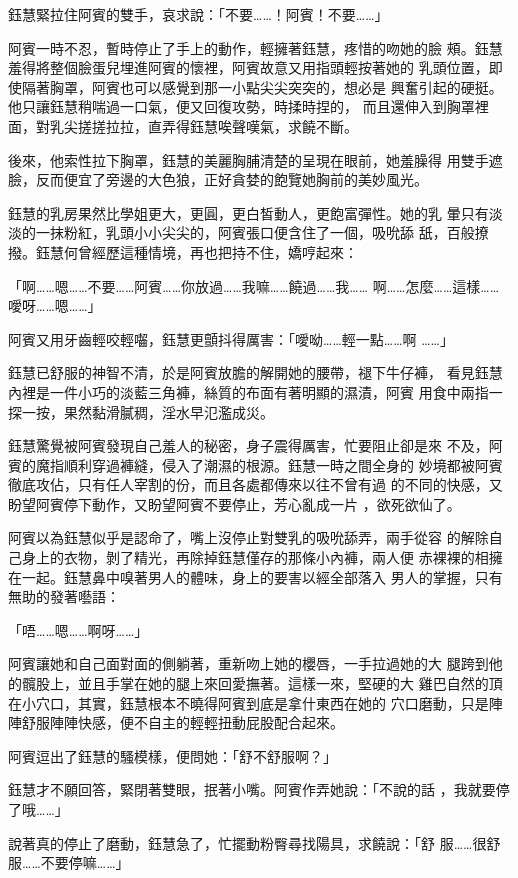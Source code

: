 鈺慧緊拉住阿賓的雙手，哀求說：「不要……！阿賓！不要……」

阿賓一時不忍，暫時停止了手上的動作，輕擁著鈺慧，疼惜的吻她的臉
頰。鈺慧羞得將整個臉蛋兒埋進阿賓的懷裡，阿賓故意又用指頭輕按著她的
乳頭位置，即使隔著胸罩，阿賓也可以感覺到那一小點尖尖突突的，想必是
興奮引起的硬挺。他只讓鈺慧稍喘過一口氣，便又回復攻勢，時揉時捏的，
而且還伸入到胸罩裡面，對乳尖搓搓拉拉，直弄得鈺慧唉聲嘆氣，求饒不斷。

後來，他索性拉下胸罩，鈺慧的美麗胸脯清楚的呈現在眼前，她羞臊得
用雙手遮臉，反而便宜了旁邊的大色狼，正好貪婪的飽覽她胸前的美妙風光。

鈺慧的乳房果然比學姐更大，更圓，更白皙動人，更飽富彈性。她的乳
暈只有淡淡的一抹粉紅，乳頭小小尖尖的，阿賓張口便含住了一個，吸吮舔
舐，百般撩撥。鈺慧何曾經歷這種情境，再也把持不住，嬌哼起來：

「啊……嗯……不要……阿賓……你放過……我嘛……饒過……我……
啊……怎麼……這樣……噯呀……嗯……」

阿賓又用牙齒輕咬輕囓，鈺慧更顫抖得厲害：「噯呦……輕一點……啊
……」

鈺慧已舒服的神智不清，於是阿賓放膽的解開她的腰帶，褪下牛仔褲，
看見鈺慧內裡是一件小巧的淡藍三角褲，絲質的布面有著明顯的濕漬，阿賓
用食中兩指一探一按，果然黏滑膩稠，淫水早氾濫成災。

鈺慧驚覺被阿賓發現自己羞人的秘密，身子震得厲害，忙要阻止卻是來
不及，阿賓的魔指順利穿過褲縫，侵入了潮濕的根源。鈺慧一時之間全身的
妙境都被阿賓徹底攻佔，只有任人宰割的份，而且各處都傳來以往不曾有過
的不同的快感，又盼望阿賓停下動作，又盼望阿賓不要停止，芳心亂成一片
，欲死欲仙了。

阿賓以為鈺慧似乎是認命了，嘴上沒停止對雙乳的吸吮舔弄，兩手從容
的解除自己身上的衣物，剝了精光，再除掉鈺慧僅存的那條小內褲，兩人便
赤裸裸的相擁在一起。鈺慧鼻中嗅著男人的體味，身上的要害以經全部落入
男人的掌握，只有無助的發著囈語：

「唔……嗯……啊呀……」

阿賓讓她和自己面對面的側躺著，重新吻上她的櫻唇，一手拉過她的大
腿跨到他的髖股上，並且手掌在她的腿上來回愛撫著。這樣一來，堅硬的大
雞巴自然的頂在小穴口，其實，鈺慧根本不曉得阿賓到底是拿什東西在她的
穴口磨動，只是陣陣舒服陣陣快感，便不自主的輕輕扭動屁股配合起來。

阿賓逗出了鈺慧的騷模樣，便問她：「舒不舒服啊？」

鈺慧才不願回答，緊閉著雙眼，抿著小嘴。阿賓作弄她說：「不說的話
，我就要停了哦……」

說著真的停止了磨動，鈺慧急了，忙擺動粉臀尋找陽具，求饒說：「舒
服……很舒服……不要停嘛……」

